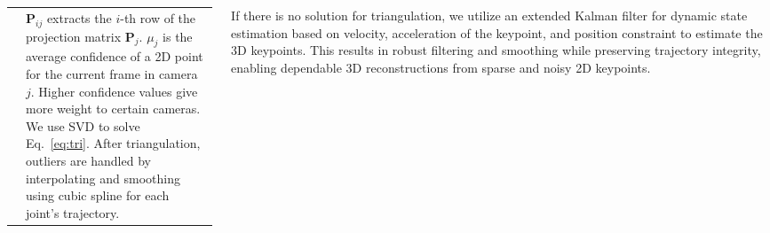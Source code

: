 \documentclass[25pt, a0paper, landscape]{tikzposter}
\begin{document}
\begin{columns}
{    \begin{tabular}{@{}p{0.55\textwidth}@{} p{0.4\textwidth}@{}}
         &
        \vspace{-260pt}
        \hspace{-1100pt}
        \parbox[t]{0.55\linewidth}{
            $\mathbf{P}_{ij}$ extracts the $i$-th row of the projection matrix $\mathbf{P}_{j}$. $\mu_{j}$ is the average confidence of a 2D point for the current frame in camera $j$. Higher confidence values give more weight to certain cameras.
            \\ We use SVD to solve Eq.~\ref{eq:tri}. After triangulation, outliers are handled by interpolating and smoothing using cubic spline for each joint's trajectory. 
        }
    \end{tabular}
     \vskip -1.4cm
     If there is no solution for triangulation, we utilize an extended Kalman filter for dynamic state estimation based on velocity, acceleration of the keypoint, and position constraint to estimate the 3D keypoints. This results in robust filtering and smoothing while preserving trajectory integrity, enabling dependable 3D reconstructions from sparse and noisy 2D keypoints.
}


\end{columns}
\end{document}
